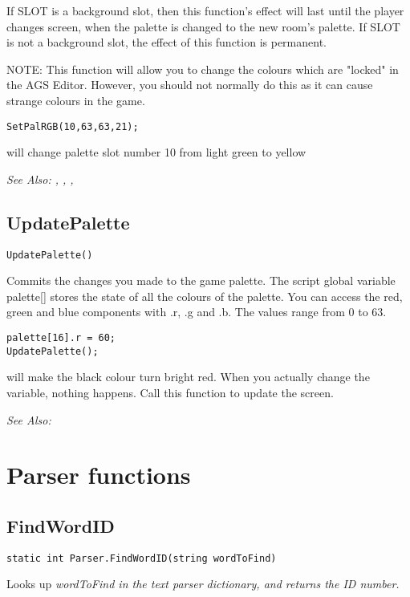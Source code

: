 If SLOT is a background slot, then this function's effect will last until
the player changes screen, when the palette is changed to the new room's
palette. If SLOT is not a background slot, the effect of this function is
permanent.

NOTE: This function will allow you to change the colours which are "locked"
in the AGS Editor. However, you should not normally do this as it can
cause strange colours in the game.

\begin{verbatim}
SetPalRGB(10,63,63,21);
\end{verbatim}
will change palette slot number 10 from light green to yellow

\it{See Also:} , , , 

\subsection{UpdatePalette}\label{UpdatePalette}%

\begin{verbatim}
UpdatePalette()
\end{verbatim}
Commits the changes you made to the game palette.
The script global variable  palette[]  stores the state of all the
colours of the palette. You can access the red, green and blue components
with .r, .g and .b. The values range from 0 to 63.

\begin{verbatim}
palette[16].r = 60;
UpdatePalette();
\end{verbatim}
will make the black colour turn bright red. When you actually change the variable,
nothing happens. Call this function to update the screen.

\it{See Also:} 


\section{Parser functions}%


\subsection{FindWordID}\label{Parser.FindWordID}%

\begin{verbatim}
static int Parser.FindWordID(string wordToFind)
\end{verbatim}
Looks up \it{wordToFind} in the text parser dictionary, and returns the ID number.


